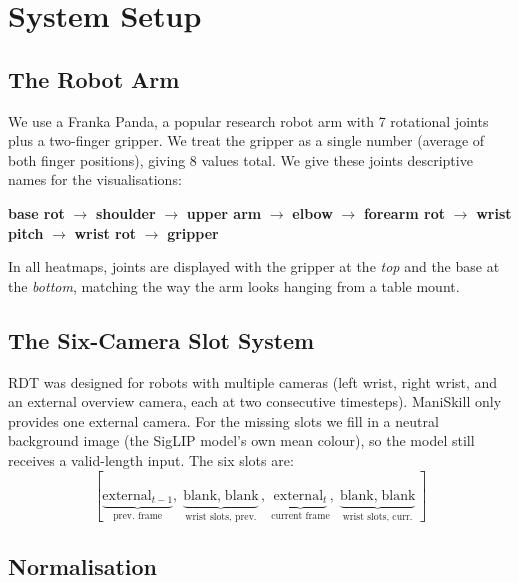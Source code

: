 \documentclass[11pt,a4paper]{article}
\begin{document}
\section{System Setup}

\subsection{The Robot Arm}

We use a Franka Panda, a popular research robot arm with 7 rotational joints
plus a two-finger gripper. We treat the gripper as a single number (average
of both finger positions), giving 8 values total. We give these joints
descriptive names for the visualisations:

\begin{center}
\textbf{base rot} $\to$ \textbf{shoulder} $\to$ \textbf{upper arm} $\to$
\textbf{elbow} $\to$ \textbf{forearm rot} $\to$ \textbf{wrist pitch} $\to$
\textbf{wrist rot} $\to$ \textbf{gripper}
\end{center}

In all heatmaps, joints are displayed with the gripper at the \emph{top}
and the base at the \emph{bottom}, matching the way the arm looks hanging
from a table mount.

\subsection{The Six-Camera Slot System}

RDT was designed for robots with multiple cameras (left wrist, right wrist, and
an external overview camera, each at two consecutive timesteps). ManiSkill
only provides one external camera. For the missing slots we fill in a neutral
background image (the SigLIP model's own mean colour), so the model still
receives a valid-length input. The six slots are:
\[
[\underbrace{\mathrm{external}_{t-1}}_{\text{prev.\ frame}},\;
 \underbrace{\text{blank},\;\text{blank}}_{\text{wrist slots, prev.}},\;
 \underbrace{\mathrm{external}_{t}}_{\text{current frame}},\;
 \underbrace{\text{blank},\;\text{blank}}_{\text{wrist slots, curr.}}]
\]

\subsection{Normalisation}
\end{document}
